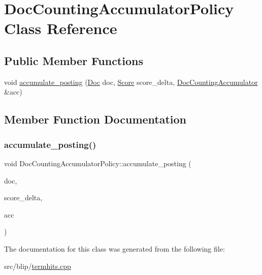 \hypertarget{classDocCountingAccumulatorPolicy}{}\section{Doc\+Counting\+Accumulator\+Policy Class Reference}
\label{classDocCountingAccumulatorPolicy}
\subsection*{Public Member Functions}
\begin{DoxyCompactItemize}
\item 
void \mbox{\hyperlink{classDocCountingAccumulatorPolicy_adf690fc6c2ee61bc722068c5093ec324}{accumulate\+\_\+posting}} (\mbox{\hyperlink{structbloodhound_1_1Doc}{Doc}} doc, \mbox{\hyperlink{structbloodhound_1_1Score}{Score}} score\+\_\+delta, \mbox{\hyperlink{structDocCountingAccumulator}{Doc\+Counting\+Accumulator}} \&acc)
\end{DoxyCompactItemize}


\subsection{Member Function Documentation}
\mbox{\label{classDocCountingAccumulatorPolicy_adf690fc6c2ee61bc722068c5093ec324}} 
\subsubsection{\texorpdfstring{accumulate\+\_\+posting()}{accumulate\_posting()}}
{\footnotesize\ttfamily void Doc\+Counting\+Accumulator\+Policy\+::accumulate\+\_\+posting (\begin{DoxyParamCaption}\item[{\mbox{\hyperlink{structbloodhound_1_1Doc}{Doc}}}]{doc,  }\item[{\mbox{\hyperlink{structbloodhound_1_1Score}{Score}}}]{score\+\_\+delta,  }\item[{\mbox{\hyperlink{structDocCountingAccumulator}{Doc\+Counting\+Accumulator}} \&}]{acc }\end{DoxyParamCaption})\hspace{0.3cm}{\ttfamily [inline]}}



The documentation for this class was generated from the following file\+:\begin{DoxyCompactItemize}
\item 
src/blip/\mbox{\hyperlink{termhits_8cpp}{termhits.\+cpp}}\end{DoxyCompactItemize}
